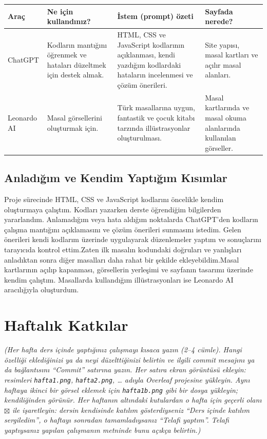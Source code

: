 \documentclass[12pt,a4paper]{article}
\newcommand{\aciklama}[1]{{\color{gray}\itshape (#1)}}
\begin{document}
\begin{longtable}{@{}p{2.6cm}p{3.6cm}p{4.2cm}p{3.4cm}@{}}
\toprule
\textbf{Araç} & \textbf{Ne için kullandınız?} & \textbf{İstem (prompt) özeti} & \textbf{Sayfada nerede?} \\
\midrule
\endhead
ChatGPT & Kodların mantığını öğrenmek ve hataları düzeltmek için destek almak. & HTML, CSS ve JavaScript kodlarının açıklanması, kendi yazdığım kodlardaki hataların incelenmesi ve çözüm önerileri. & Site yapısı, masal kartları ve açılır masal alanları. \\
Leonardo AI & Masal görsellerini oluşturmak için. & Türk masallarına uygun, fantastik ve çocuk kitabı tarzında illüstrasyonlar oluşturulması. & Masal kartlarında ve masal okuma alanlarında kullanılan görseller. \\
\bottomrule
\end{longtable}

\subsection{Anladığım ve Kendim Yaptığım Kısımlar}
Proje sürecinde HTML, CSS ve JavaScript kodlarını öncelikle kendim oluşturmaya çalıştım. Kodları yazarken derste öğrendiğim bilgilerden yararlandım. Anlamadığım veya hata aldığım noktalarda ChatGPT'den kodların çalışma mantığını açıklamasını ve çözüm önerileri sunmasını istedim. Gelen önerileri kendi kodlarım üzerinde uygulayarak düzenlemeler yaptım ve sonuçlarını tarayıcıda kontrol ettim.Zaten ilk masalın kodundaki doğruları ve yanlışları anladıktan sonra diğer masalları daha rahat bir şekilde ekleyebildim.Masal kartlarının açılıp kapanması, görsellerin yerleşimi ve sayfanın tasarımı üzerinde kendim çalıştım. Masallarda kullandığım illüstrasyonları ise Leonardo AI aracılığıyla oluşturdum.

\section{Haftalık Katkılar}
\aciklama{Her hafta ders içinde yaptığınız çalışmayı kısaca yazın (2--4 cümle). Hangi
özelliği eklediğinizi ya da neyi düzelttiğinizi belirtin ve ilgili commit mesajını
ya da bağlantısını ``Commit'' satırına yazın. Her satıra ekran görüntüsü ekleyin:
resimleri \texttt{hafta1.png}, \texttt{hafta2.png}, \ldots{} adıyla Overleaf
projesine yükleyin. Aynı haftaya ikinci bir görsel eklemek için
\texttt{hafta1b.png} gibi bir dosya yükleyin; kendiliğinden görünür.
Her haftanın altındaki kutulardan o hafta için geçerli olanı $\boxtimes$ ile
işaretleyin: dersin kendisinde katılım gösterdiyseniz ``Ders içinde katılım
sergiledim'', o haftayı sonradan tamamladıysanız ``Telafi yaptım''. Telafi
yaptıysanız yapılan çalışmanın metninde bunu açıkça belirtin.}
\end{document}
